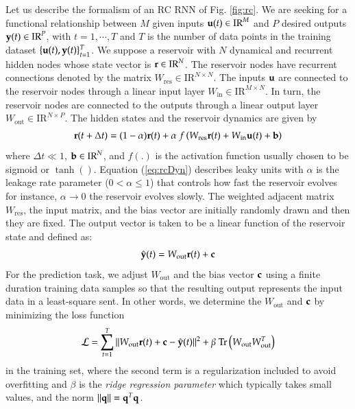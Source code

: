 \documentclass[12pt,letterpaper]{article}
\newcommand{\yy}{{\bf y}}
\providecommand{\uu}[0]{{ \bf{u} }}
\providecommand{\yy}[0]{{ \bf{y} }}
\providecommand{\rr}[0]{{ \bf{r} }}
\begin{document}
Let us describe the formalism of an RC RNN of Fig. \ref{fig:rc}. We are seeking for a functional relationship  between $M$ given inputs $\uu (t) \in \mathrm{IR}^{M}$  and $P$ desired outputs  $\yy(t) \in \mathrm{IR}^{P}$, with $t=1,\cdots,T$ and $T$ is the number of data points in the training dataset $\{ \uu(t),\yy(t) \}_{t=1}^T$. We suppose a reservoir with $N$ dynamical and recurrent hidden nodes whose state vector is $\rr \in \mathrm{IR}^{N}$. The reservoir nodes have recurrent connections denoted by the matrix $W_\text{res}\in \mathrm{IR}^{N \times N}$.
The inputs $\uu$ are connected to the reservoir nodes through a linear input layer $W_\text{in} \in \mathrm{IR}^{M \times N}$.  In turn, the reservoir nodes are connected to the outputs through a linear output layer $W_\text{out} \in \mathrm{IR}^{N \times P}$. The hidden states and the reservoir dynamics are given by
\begin{align}
\label{eq:rcDyn}
\rr(t+\Delta t) = (1-\alpha)\rr(t) + \alpha\ f \left( W_\text{res} \rr(t) + W_\text{in} \uu(t) +{\bf b} \right)
\end{align}
where $\Delta t \ll 1$, ${\bf b}\in \mathrm{IR}^{N} $,  and $f(.)$ is the activation function usually chosen to be  sigmoid or $\tanh()$. Equation (\ref{eq:rcDyn}) describes  leaky units with $\alpha$ is the leakage rate parameter ($0<\alpha\le 1$) that controls how fast the reservoir evolves for instance, $\alpha \rightarrow 0$ the reservoir evolves slowly.  The weighted adjacent matrix $W_\text{res}$, the input matrix, and the bias vector are initially randomly drawn and then they are fixed. The output vector is taken to be a linear function of the reservoir state and defined as:
\begin{align}
\label{eq:yout}
\hat \yy(t) = W_\text{out}\rr(t) + {\bf c}
\end{align}
For the prediction task, we adjust $W_\text{out}$ and the bias vector ${\bf c}$ using a finite duration training data samples so that the resulting output represents the input data in a least-square sent. In other words, we determine the $W_\text{out}$ and ${\bf c}$  by minimizing the loss function
\begin{align}
\label{eq:loss}
\mathcal{L } = \sum_{t=1}^T || W_\text{out}\rr(t ) + {\bf c} - \hat \yy( t) ||^2 + \beta\  \text{Tr}\left( W_\text{out} W_\text{out}^T \right)
\end{align}
in the training set, where the second term is a regularization included to avoid overfitting and $\beta$ is the \emph{ridge regression parameter} which typically takes small values, and the norm $|| {\bf q} || = {\bf q}^T{\bf q}$. 
\end{document}
